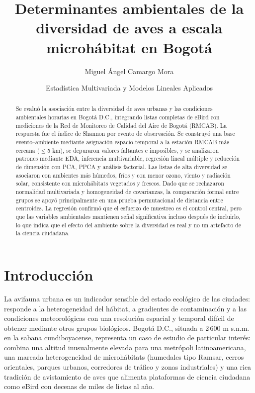\documentclass[9pt,letterpaper]{article}
\title{\vspace{-1.3cm}\textbf{Determinantes ambientales de la diversidad de aves a escala microhábitat en Bogotá}}
\author{Miguel Ángel Camargo Mora}
\date{Estadística Multivariada y Modelos Lineales Aplicados}
\begin{document}
\maketitle
\vspace{-0.8cm}

\begin{abstract}
\small
Se evaluó la asociación entre la diversidad de aves urbanas y las condiciones ambientales horarias en Bogotá D.C., integrando listas completas de eBird con mediciones de la Red de Monitoreo de Calidad del Aire de Bogotá (RMCAB). La respuesta fue el índice de Shannon por evento de observación. Se construyó una base evento--ambiente mediante asignación espacio-temporal a la estación RMCAB más cercana ($\leq$5 km), se depuraron valores faltantes e imposibles, y se analizaron patrones mediante EDA, inferencia multivariable, regresión lineal múltiple y reducción de dimensión con PCA, PPCA y análisis factorial. Las listas de alta diversidad se asociaron con ambientes más húmedos, fríos y con menor ozono, viento y radiación solar, consistente con microhábitats vegetados y frescos. Dado que se rechazaron normalidad multivariada y homogeneidad de covarianzas, la comparación formal entre grupos se apoyó principalmente en una prueba permutacional de distancia entre centroides. La regresión confirmó que el esfuerzo de muestreo es el control central, pero que las variables ambientales mantienen señal significativa incluso después de incluirlo, lo que indica que el efecto del ambiente sobre la diversidad es real y no un artefacto de la ciencia ciudadana.
\end{abstract}

\section{Introducción}

La avifauna urbana es un indicador sensible del estado ecológico de las ciudades: responde a la heterogeneidad del hábitat, a gradientes de contaminación y a las condiciones meteorológicas con una resolución espacial y temporal difícil de obtener mediante otros grupos biológicos. Bogotá D.C., situada a 2\,600 m s.n.m. en la sabana cundiboyacense, representa un caso de estudio de particular interés: combina una altitud inusualmente elevada para una metrópoli latinoamericana, una marcada heterogeneidad de microhábitats (humedales tipo Ramsar, cerros orientales, parques urbanos, corredores de tráfico y zonas industriales) y una rica tradición de avistamiento de aves que alimenta plataformas de ciencia ciudadana como eBird con decenas de miles de listas al año.
\end{document}
